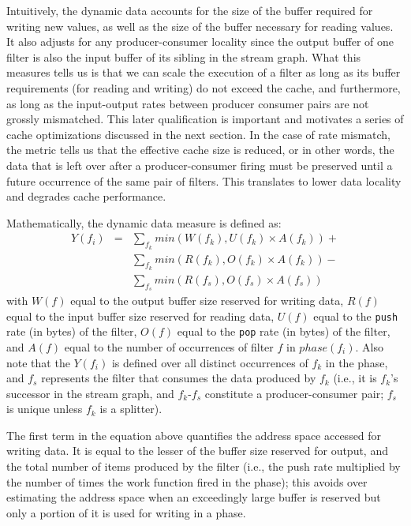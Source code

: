 Intuitively, the dynamic data accounts for the size of the buffer
required for writing new values, as well as the size of the buffer
necessary for reading values. It also adjusts for any
producer-consumer locality since the output buffer of one filter is
also the input buffer of its sibling in the stream graph. What this
measures tells us is that we can scale the execution of a filter as
long as its buffer requirements (for reading and writing) do not
exceed the cache, and furthermore, as long as the input-output rates
between producer consumer pairs are not grossly mismatched. This later
qualification is important and motivates a series of cache
optimizations discussed in the next section. In the case of rate
mismatch, the metric tells us that the effective cache size is
reduced, or in other words, the data that is left over after a
producer-consumer firing must be preserved until a future occurrence of
the same pair of filters. This translates to lower data locality and
degrades cache performance.

Mathematically, the dynamic data measure is defined as:
\begin{eqnarray}
  \nonumber
  Y(f_i) &=&\sum_{f_k} min(W(f_k), U(f_k) \times A(f_k)) + \\
  \nonumber
	   &&\sum_{f_k} min(R(f_k), O(f_k) \times A(f_k)) - \\
  \nonumber
         &&\sum_{f_s} min(R(f_s), O(f_s) \times A(f_s))
\end{eqnarray}
with $W(f)$ equal to the output buffer size reserved for writing data, $R(f)$
equal to the input buffer size reserved for reading data, $U(f)$ equal to the
{\tt push} rate (in bytes) of the filter, $O(f)$ equal to the {\tt pop} rate (in
bytes) of the filter, and $A(f)$ equal to the number of occurrences of
filter $f$ in $phase(f_i)$. Also note that the $Y(f_i)$ is defined
over all distinct occurrences of $f_k$ in the phase, and $f_s$
represents the filter that consumes the data produced by $f_k$ (i.e.,
it is $f_k$'s successor in the stream graph, and $f_k$-$f_s$
constitute a producer-consumer pair; $f_s$ is unique unless $f_k$ is a splitter).

The first term in the equation above quantifies the address space
accessed for writing data. It is  equal to the lesser of the buffer size
reserved for output, and the total number of items produced by
the filter (i.e., the push rate multiplied by the number of times the
work function fired in the phase); this avoids over estimating the
address space when an exceedingly large buffer is reserved but only a
portion of it is used for writing in a phase.

